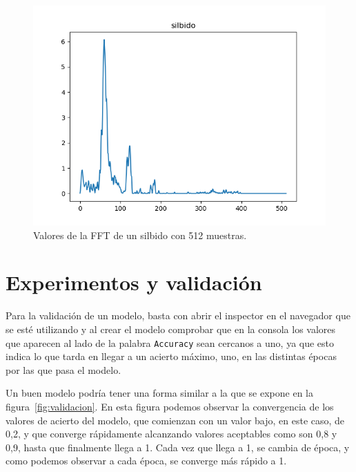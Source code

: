 \documentclass[a4paper, 12pt]{book}
\begin{document}
\begin{figure}
	\centering
	\includegraphics[width=12cm, keepaspectratio]{img/silbido512.png}
	\caption{Valores de la FFT de un silbido con 512 muestras.}\label{fig:silbido512}
\end{figure}



\cleardoublepage
\chapter{Experimentos y validación}
\label{chap:experimentos-validacion}

Para la validación de un modelo, basta con abrir el inspector en el navegador que se esté utilizando y al crear el modelo comprobar que en la consola los valores que aparecen al lado de la palabra \texttt{Accuracy} sean cercanos a uno, ya que esto indica lo que tarda en llegar a un acierto máximo, uno, en las distintas épocas por las que pasa el modelo.

Un buen modelo podría tener una forma similar a la que se expone en la figura~\ref{fig:validacion}. En esta figura podemos observar la convergencia de los valores de acierto del modelo, que comienzan con un valor bajo, en este caso, de 0,2, y que converge rápidamente alcanzando valores aceptables como son 0,8 y 0,9, hasta que finalmente llega a 1. Cada vez que llega a 1, se cambia de época, y como podemos observar a cada época, se converge más rápido a 1.
\end{document}
